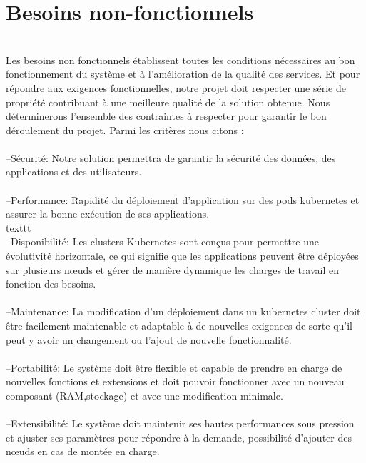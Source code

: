 \section{\LARGE Besoins non-fonctionnels}
\texttt{}\\[0.1cm]
\textsf{\selectfont{} Les besoins non fonctionnels établissent toutes les conditions nécessaires au bon fonctionnement du système et à l'amélioration de la qualité des services. Et pour répondre aux exigences fonctionnelles, notre projet doit respecter une série de propriété contribuant à une meilleure qualité de la solution obtenue.
Nous déterminerons l'ensemble des contraintes à respecter pour garantir le bon déroulement du projet. Parmi les critères nous citons :\\\texttt{}\\[0.01cm]
--Sécurité: Notre solution permettra de garantir la sécurité des données, des applications et des utilisateurs.\\\texttt{}\\[0.01cm]
--Performance: Rapidité du déploiement d'application sur des pods kubernetes et assurer la bonne exécution de ses applications.\\texttt{}\\[0.01cm]
--Disponibilité: Les clusters Kubernetes sont conçus pour permettre une évolutivité horizontale, ce qui signifie que les applications peuvent être déployées sur plusieurs nœuds et gérer de manière dynamique les charges de travail en fonction des besoins.\\\texttt{}\\[0.01cm]
--Maintenance: La modification d'un déploiement dans un kubernetes cluster doit être facilement maintenable et adaptable à de nouvelles exigences de sorte qu'il peut y avoir un changement ou l'ajout de nouvelle fonctionnalité.\\\texttt{}\\[0.01cm]
--Portabilité: Le système doit être flexible et capable de prendre en charge de nouvelles fonctions et extensions et doit pouvoir fonctionner avec un nouveau composant (RAM,stockage) et avec une modification minimale.\\\texttt{}\\[0.01cm]
--Extensibilité: Le système doit maintenir ses hautes performances sous pression et ajuster ses paramètres pour répondre à la demande, possibilité d’ajouter des nœuds en cas de montée en charge. \\\texttt{}\\[0.01cm]
}
